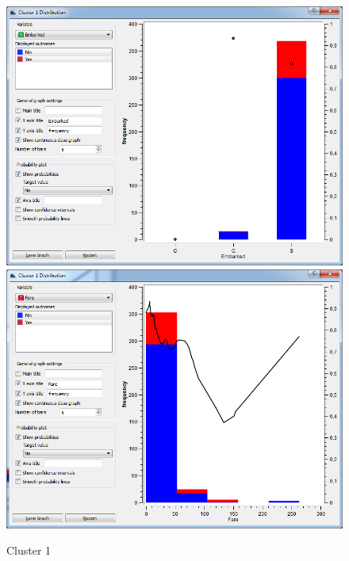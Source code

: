 \documentclass[a4paper,11pt]{article}
\begin{document}
\begin{figure}[h]
\begin{center}
		\includegraphics[scale=0.30]{ClusterDistribution/Cluster1/Embarked}
		\includegraphics[scale=0.30]{ClusterDistribution/Cluster1/Fare}
	\end{center}
	\caption{Cluster 1}
	\label{ClusterOne}
\end{figure}
\end{document}
